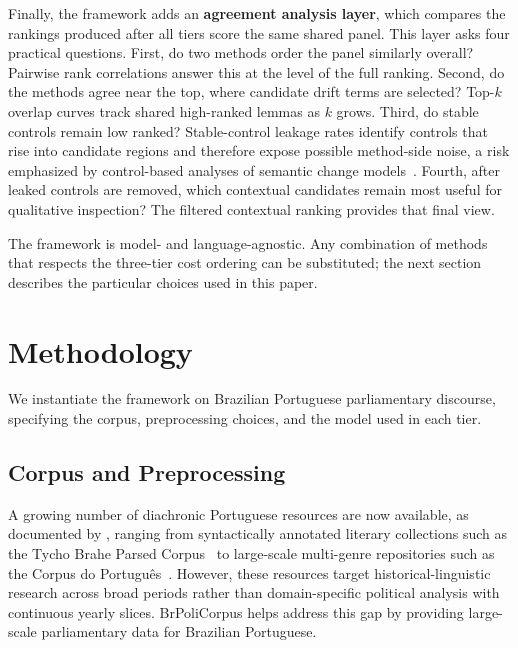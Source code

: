 \documentclass[12pt]{article}
\begin{document}
Finally, the framework adds an \textbf{agreement analysis layer}, which compares the rankings produced after all tiers score the same shared panel. This layer asks four practical questions. First, do two methods order the panel similarly overall? Pairwise rank correlations answer this at the level of the full ranking. Second, do the methods agree near the top, where candidate drift terms are selected? Top-$k$ overlap curves track shared high-ranked lemmas as $k$ grows. Third, do stable controls remain low ranked? Stable-control leakage rates identify controls that rise into candidate regions and therefore expose possible method-side noise, a risk emphasized by control-based analyses of semantic change models~\cite{dubossarsky-etal-2017-outta}. Fourth, after leaked controls are removed, which contextual candidates remain most useful for qualitative inspection? The filtered contextual ranking provides that final view.

The framework is model- and language-agnostic. Any combination of methods that respects the three-tier cost ordering can be substituted; the next section describes the particular choices used in this paper.

\section{Methodology}
\label{sec:methodology}

We instantiate the framework on Brazilian Portuguese parliamentary discourse, specifying the corpus, preprocessing choices, and the model used in each tier.

\subsection{Corpus and Preprocessing}

A growing number of diachronic Portuguese resources are now available, as documented by \cite{osorio-cardoso-2025-historical}, ranging from syntactically annotated literary collections such as the Tycho Brahe Parsed Corpus~\cite{galves-faria-2017-tycho} to large-scale multi-genre repositories such as the Corpus do Portugu\^es~\cite{davies-ferreira-2006-corpusdoportugues}. However, these resources
target historical-linguistic research across broad periods rather than
domain-specific political analysis with continuous yearly slices. BrPoliCorpus \cite{lima-lopes-2025-brpolicorpus} helps address this gap
by providing large-scale parliamentary data for Brazilian Portuguese.
\end{document}
